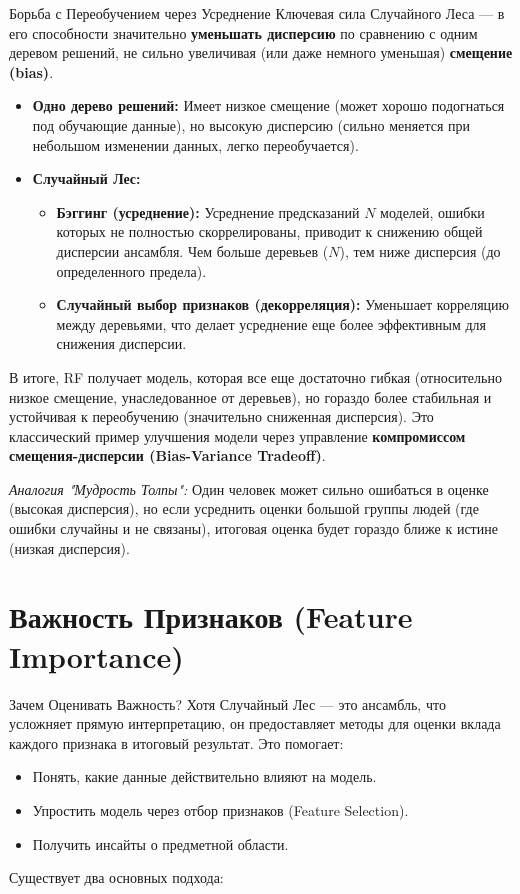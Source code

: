 \begin{myblock}{Борьба с Переобучением через Усреднение}
    Ключевая сила Случайного Леса — в его способности значительно \textbf{уменьшать дисперсию} по сравнению с одним деревом решений, не сильно увеличивая (или даже немного уменьшая) \textbf{смещение (bias)}.
    \begin{itemize}
        \item \textbf{Одно дерево решений:} Имеет низкое смещение (может хорошо подогнаться под обучающие данные), но высокую дисперсию (сильно меняется при небольшом изменении данных, легко переобучается).
        \item \textbf{Случайный Лес:}
            \begin{itemize}
                \item \textbf{Бэггинг (усреднение):} Усреднение предсказаний \(N\) моделей, ошибки которых не полностью скоррелированы, приводит к снижению общей дисперсии ансамбля. Чем больше деревьев (\(N\)), тем ниже дисперсия (до определенного предела).
                \item \textbf{Случайный выбор признаков (декорреляция):} Уменьшает корреляцию между деревьями, что делает усреднение еще более эффективным для снижения дисперсии.
            \end{itemize}
    \end{itemize}
    В итоге, RF получает модель, которая все еще достаточно гибкая (относительно низкое смещение, унаследованное от деревьев), но гораздо более стабильная и устойчивая к переобучению (значительно сниженная дисперсия). Это классический пример улучшения модели через управление \textbf{компромиссом смещения-дисперсии (Bias-Variance Tradeoff)}.
    
    \textit{Аналогия "Мудрость Толпы":} Один человек может сильно ошибаться в оценке (высокая дисперсия), но если усреднить оценки большой группы людей (где ошибки случайны и не связаны), итоговая оценка будет гораздо ближе к истине (низкая дисперсия).
\end{myblock}

\section{Важность Признаков (Feature Importance)}

\begin{textbox}{Зачем Оценивать Важность?}
    Хотя Случайный Лес — это ансамбль, что усложняет прямую интерпретацию, он предоставляет методы для оценки вклада каждого признака в итоговый результат. Это помогает:
    \begin{itemize}
        \item Понять, какие данные действительно влияют на модель.
        \item Упростить модель через отбор признаков (Feature Selection).
        \item Получить инсайты о предметной области.
    \end{itemize}
    Существует два основных подхода:
\end{textbox}


